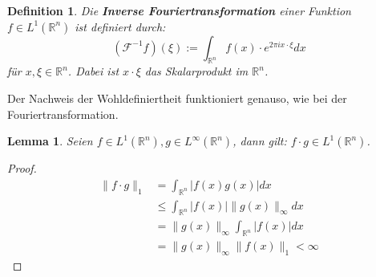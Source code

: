 \documentclass{article}
\newcommand{\R}[0]{\mathbb{R}}
\newtheorem{defin}{Definition}
\newtheorem{lemma}{Lemma}
\begin{document}
\begin{defin}
    Die \textbf{Inverse Fouriertransformation} einer Funktion $f \in L^1(\R^n)$ ist definiert durch:
    \begin{equation}
        (\mathcal{F}^{-1}f)(\xi) := \int_{\R^n} f(x) \cdot e^{2\pi i x \cdot \xi} dx
    \end{equation}
    für $x, \xi \in \R^n$. Dabei ist $x \cdot \xi$ das Skalarprodukt im $\R^n$.
\end{defin}
Der Nachweis der Wohldefiniertheit funktioniert genauso, wie bei der Fouriertransformation.

\begin{lemma}\label{lem:l1linfty}
    Seien $f\in L^1(\R^n), g \in L^{\infty}(\R^n)$, dann gilt: $f \cdot g \in L^1(\R^n)$.
\end{lemma}

\begin{proof}
    \begin{align*}
        \lVert f \cdot g \rVert_1 &= \int_{\R^n} |f(x)g(x)| dx \\
        &\leq \int_{\R^n} |f(x)| \lVert g(x) \rVert_{\infty} dx \\
        &= \lVert g(x) \rVert_{\infty} \int_{\R^n} |f(x)| dx \\
        &= \lVert g(x) \rVert_{\infty} \lVert f(x) \rVert_1 < \infty
    \end{align*}
\end{proof}
\end{document}
